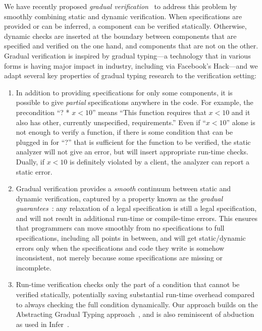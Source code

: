 \documentclass[10pt,twocolumn]{article}
\begin{document}
\begin{sloppypar}
We have recently proposed \textit{gradual verification}~\cite{baderAl:vmcai2018} to address this problem by smoothly combining static and dynamic verification. When specifications are provided or can be inferred, a component can be verified statically.  Otherwise, dynamic checks are inserted at the boundary between components that are specified and verified on the one hand, and components that are not on the other. Gradual verification is inspired by gradual typing---a technology that in various forms is having major impact in industry, including via Facebook's Hack---and we adapt several key properties of gradual typing research to the verification setting:

\begin{enumerate}[leftmargin=1em]\itemsep0em

\item
In addition to providing specifications for only some components, it is possible to give \textit{partial} specifications anywhere in the code.  For example, the precondition ``? * $x<10$'' means ``This function requires that $x<10$ and it also has other, currently unspecified, requirements.''  Even if ``$x<10$'' alone is not enough to verify a function, if there is some condition that can be plugged in for ``?'' that is sufficient for the function to be verified, the static analyzer will not give an error, but will insert appropriate run-time checks. Dually, if $x<10$ is definitely violated by a client, the analyzer can report a static error.

\item
Gradual verification provides a {\em smooth} continuum between static and dynamic verification, captured by a property known as the \textit{gradual guarantees}~\cite{siekAl:snapl2015}: any relaxation of a legal specification is still a legal specification, and will not result in additional run-time or compile-time errors.  This ensures that programmers can move smoothly from no specifications to full specifications, including all points in between, and will get static/dynamic errors only when the specifications and code they write is somehow inconsistent, not merely because some specifications are missing or incomplete.

\item
Run-time verification checks only the part of a condition that cannot be verified statically, potentially saving substantial run-time overhead compared to always checking the full condition dynamically.  Our approach builds on the Abstracting Gradual Typing approach~\cite{garciaAl:popl2016}, and is also reminiscent of abduction as used in Infer~\cite{Calcagno:2011:CSA:2049697.2049700}.


\end{enumerate}
\end{sloppypar}
\end{document}
